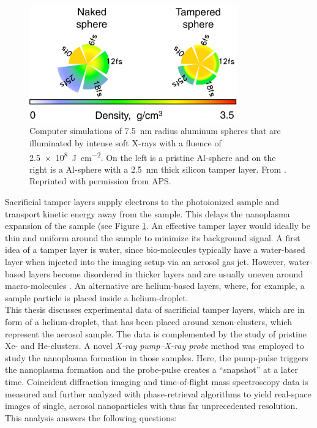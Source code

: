 %
\begin{figure}
	\centering
		\includegraphics[width=0.80\textwidth]{images/tamper-layer.png}
	\caption[Computer simulations of aluminum spheres with tamper layers]{Computer simulations of \SI{7.5}{\nano\meter} radius aluminum spheres that are illuminated by intense soft X-rays with a fluence of \SI{2.5e8}{\joule\per\square\centi\meter}. On the left is a pristine Al-sphere and on the right is a Al-sphere with a \SI{2.5}{\nano\meter} thick silicon tamper layer. From \citep{Hau-Riege-2010-PRL}. Reprinted with permission from APS.}
	\label{fig:tamper-layer}
\end{figure}
%
Sacrificial tamper layers supply electrons to the photoionized sample and transport kinetic energy away from the sample. This delays the nanoplasma expansion of the sample (see Figure \ref{fig:tamper-layer}. An effective tamper layer would ideally be thin and uniform around the sample to minimize its background signal. A first idea of a tamper layer is water, since bio-molecules typically have a water-based layer when injected into the imaging setup via an aerosol gas jet. However, water-based layers become disordered in thicker layers and are usually uneven around macro-molecules \citep{Aquila-2015-StrucDyn}. An alternative are helium-based layers, where, for example, a sample particle is placed inside a helium-droplet.\\[1\baselineskip]
%
This thesis discusses experimental data of sacrificial tamper layers, which are in form of a helium-droplet, that has been placed around xenon-clusters, which represent the aerosol sample. The data is complemented by the study of pristine Xe- and He-clusters. A novel \textit{X-ray pump--X-ray probe} method was employed to study the nanoplasma formation in those samples. Here, the pump-pulse triggers the nanoplasma formation and the probe-pulse creates a ``snapshot'' at a later time. Coincident diffraction imaging and time-of-flight mass spectroscopy data is measured and further analyzed with phase-retrieval algorithms to yield real-space images of single, aerosol nanoparticles with thus far unprecedented resolution. This analysis answers the following questions:
